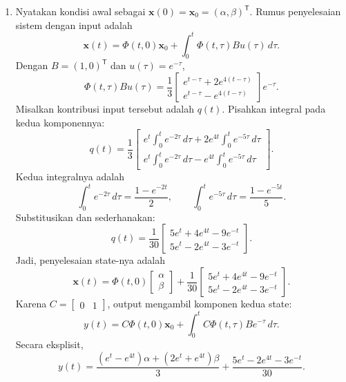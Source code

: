 \documentclass[11pt,a4paper]{article}
\newcommand{\xx}{\mathbf{x}}
\begin{document}
\begin{enumerate}[itemsep=12pt,parsep=5pt]
\begin{enumerate}
          \item Nyatakan kondisi awal sebagai $\xx(0)=\xx_0=(\alpha,\beta)^{\mathsf T}$.
                Rumus penyelesaian sistem dengan input adalah
                \[
                  \xx(t)=\Phi(t,0)\xx_0+\int_0^t\Phi(t,\tau)Bu(\tau)\,d\tau.
                \]
                Dengan $B=(1,0)^{\mathsf T}$ dan $u(\tau)=e^{-\tau}$,
                \[
                  \Phi(t,\tau)Bu(\tau)
                  =\frac13\begin{bmatrix}
                    e^{t-\tau}+2e^{4(t-\tau)}\\
                    e^{t-\tau}-e^{4(t-\tau)}
                  \end{bmatrix}e^{-\tau}.
                \]
                Misalkan kontribusi input tersebut adalah $q(t)$.
                Pisahkan integral pada kedua komponennya:
                \[
                  q(t)=\frac13\begin{bmatrix}
                    e^t\displaystyle\int_0^t e^{-2\tau}\,d\tau
                      +2e^{4t}\displaystyle\int_0^t e^{-5\tau}\,d\tau\\[8pt]
                    e^t\displaystyle\int_0^t e^{-2\tau}\,d\tau
                      -e^{4t}\displaystyle\int_0^t e^{-5\tau}\,d\tau
                  \end{bmatrix}.
                \]
                Kedua integralnya adalah
                \[
                  \int_0^t e^{-2\tau}\,d\tau=\frac{1-e^{-2t}}2,\qquad
                  \int_0^t e^{-5\tau}\,d\tau=\frac{1-e^{-5t}}5.
                \]
                Substitusikan dan sederhanakan:
                \[
                  q(t)=\frac1{30}\begin{bmatrix}
                    5e^t+4e^{4t}-9e^{-t}\\
                    5e^t-2e^{4t}-3e^{-t}
                  \end{bmatrix}.
                \]
                Jadi, penyelesaian state-nya adalah
                \[
                  \xx(t)=\Phi(t,0)\begin{bmatrix}\alpha\\\beta\end{bmatrix}
                  +\frac1{30}\begin{bmatrix}
                    5e^t+4e^{4t}-9e^{-t}\\
                    5e^t-2e^{4t}-3e^{-t}
                  \end{bmatrix}.
                \]
                Karena $C=\begin{bmatrix}0&1\end{bmatrix}$, output mengambil komponen kedua state:
                \[
                  y(t)=C\Phi(t,0)\xx_0
                       +\int_0^t C\Phi(t,\tau)Be^{-\tau}\,d\tau.
                \]
                Secara eksplisit,
                \[
                  y(t)=\frac{(e^t-e^{4t})\alpha+(2e^t+e^{4t})\beta}{3}
                      +\frac{5e^t-2e^{4t}-3e^{-t}}{30}.
                \]
        \end{enumerate}


\end{enumerate}
\end{document}
